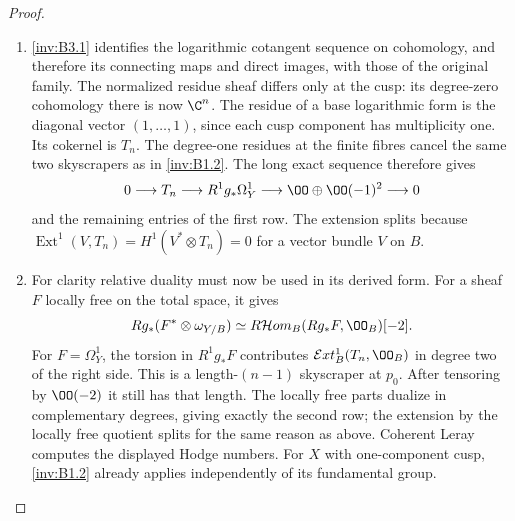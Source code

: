 \begin{proof}
\begin{enumerate}[label=\arabic*.,leftmargin=*]
\item \ref{inv:B3.1} identifies the logarithmic cotangent sequence on cohomology,
and therefore its connecting maps and direct images, with those of
the original family. The normalized residue sheaf differs only at
the cusp: its degree-zero cohomology there is now $\C^n$.
The residue of a base logarithmic form is the diagonal vector
$(1,\ldots,1)$, since each cusp component has multiplicity one.
Its cokernel is $T_n$. The degree-one residues at the finite fibres
cancel the same two skyscrapers as in \ref{inv:B1.2}. The long exact sequence
therefore gives
\[
0\longrightarrow T_n\longrightarrow R^1g_*\Omega^1_Y
\longrightarrow\OO\oplus\OO(-1)^2\longrightarrow0
\]
and the remaining entries of the first row. The extension splits
because $\operatorname{Ext}^1(V,T_n)=H^1(V^*\otimes T_n)=0$
for a vector bundle $V$ on $B$.

\item For clarity relative duality must now be used in its derived form.
For a sheaf $F$ locally free on the total space, it gives
\[
Rg_*(F^*\otimes\omega_{Y/B})
\simeq R\mathcal Hom_B(Rg_*F,\OO_B)[-2].
\]
For $F=\Omega^1_Y$, the torsion in $R^1g_*F$ contributes
$\mathcal Ext^1_B(T_n,\OO_B)$ in degree two of the right side.
This is a length-$(n-1)$ skyscraper at $p_0$. After tensoring by
$\OO(-2)$ it still has that length. The locally free parts dualize
in complementary degrees, giving exactly the second row; the
extension by the locally free quotient splits for the same reason
as above. Coherent Leray computes the displayed Hodge numbers.
For $X$ with one-component cusp, \ref{inv:B1.2} already applies independently
of its fundamental group.
\end{enumerate}
\end{proof}

